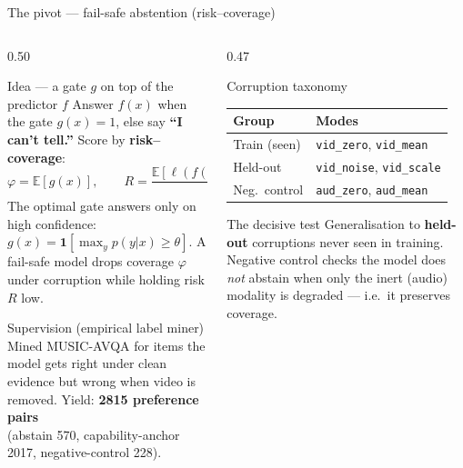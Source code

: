 \documentclass[10pt,aspectratio=169]{beamer}
\begin{document}
\begin{frame}{The pivot --- fail-safe abstention (risk--coverage)}

\begin{columns}[T]
\begin{column}{0.50\textwidth}

\begin{block}{Idea --- a gate $g$ on top of the predictor $f$}
{\footnotesize
Answer $f(x)$ when the gate $g(x)\!=\!1$, else say \textbf{``I can't tell.''}
Score by \textbf{risk--coverage}:
\[
\varphi=\mathbb E[g(x)],\qquad
R=\frac{\mathbb E[\ell(f(x),y)\,g(x)]}{\varphi}.
\]
The optimal gate answers only on high confidence:
$g(x)=\mathbf 1[\max_y p(y|x)\!\ge\!\theta]$. A fail-safe model drops coverage
$\varphi$ under corruption while holding risk $R$ low.}
\end{block}

\begin{block}{Supervision (empirical label miner)}
{\footnotesize
Mined MUSIC-AVQA for items the model gets right under clean evidence but wrong
when video is removed. Yield: \textbf{2815 preference pairs}\\
(abstain 570, capability-anchor 2017, negative-control 228).}
\end{block}

\end{column}

\begin{column}{0.47\textwidth}

\begin{block}{Corruption taxonomy}
{\footnotesize
\begin{tabular}{l p{3.2cm}}
\toprule
\textbf{Group} & \textbf{Modes} \\
\midrule
Train (seen) & \texttt{vid\_zero}, \texttt{vid\_mean} \\
\rowcolor{paperD!12}
Held-out & \texttt{vid\_noise}, \texttt{vid\_scale} \\
Neg.\ control & \texttt{aud\_zero}, \texttt{aud\_mean} \\
\bottomrule
\end{tabular}}
\end{block}

\begin{block}{The decisive test}
{\footnotesize
Generalisation to \textbf{held-out} corruptions never seen in training.
Negative control checks the model does \emph{not} abstain when only the inert
(audio) modality is degraded --- i.e.\ it preserves coverage.}
\end{block}

\end{column}
\end{columns}

\end{frame}
\end{document}

